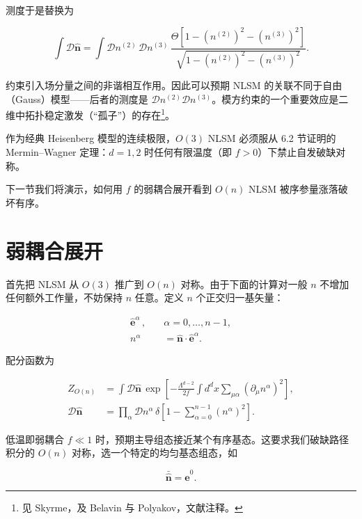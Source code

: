测度于是替换为

\begin{equation*}
\int \mathcal {D} \hat {\mathbf {n}} = \int \mathcal {D} n ^ {(2)} \, \mathcal {D} n ^ {(3)} \, \frac {\Theta \left[ 1 - ( n ^ {(2)} ) ^ {2} - ( n ^ {(3)} ) ^ {2} \right]}{\sqrt {1 - ( n ^ {(2)} ) ^ {2} - ( n ^ {(3)} ) ^ {2}}}.
\tag{13.11}
\end{equation*}

约束引入场分量之间的非谐相互作用。因此可以预期 NLSM 的关联不同于自由（Gauss）模型——后者的测度是 $\mathcal{D}n^{(2)}\mathcal{D}n^{(3)}$。模方约束的一个重要效应是二维中拓扑稳定激发（“孤子”）的存在\footnote{见 Skyrme，及 Belavin 与 Polyakov，文献注释。}。

作为经典 Heisenberg 模型的连续极限，$O(3)$ NLSM 必须服从 6.2 节证明的 Mermin--Wagner 定理：$d = 1, 2$ 时任何有限温度（即 $f > 0$）下禁止自发破缺对称。

下一节我们将演示，如何用 $f$ 的弱耦合展开看到 $O(n)$ NLSM 被序参量涨落破坏有序。

\section{弱耦合展开}

首先把 NLSM 从 $O(3)$ 推广到 $O(n)$ 对称。由于下面的计算对一般 $n$ 不增加任何额外工作量，不妨保持 $n$ 任意。定义 $n$ 个正交归一基矢量：

\begin{align*}
\hat {\mathbf {e}} ^ {\alpha} \, , \quad & \alpha = 0, \dots , n - 1 ,\\
n ^ {\alpha} & = \hat {\mathbf {n}} \cdot \hat {\mathbf {e}} ^ {\alpha} .
\tag{13.12}
\end{align*}

配分函数为

\begin{align*}
Z_{O(n)} & = \int \mathcal {D} \hat {\mathbf {n}} \, \exp \left[ - \frac {\Lambda^ {d - 2}}{2 f} \int d ^ {d} x \sum_ {\mu \alpha} \left( \partial_ {\mu} n ^ {\alpha} \right) ^ {2} \right] ,\\
\mathcal {D} \hat {\mathbf {n}} & = \prod_ {\alpha} \mathcal {D} n ^ {\alpha} \, \delta \left[ 1 - \sum_ {\alpha = 0} ^ {n - 1} \left( n ^ {\alpha} \right) ^ {2} \right] .
\tag{13.13}
\end{align*}

低温即弱耦合 $f \ll 1$ 时，预期主导组态接近某个有序基态。这要求我们破缺路径积分的 $O(n)$ 对称，选一个特定的均匀基态组态，如

\begin{equation*}
\bar {\hat {\mathbf {n}}} = \hat {\mathbf {e}} ^ {0}.
\tag{13.14}
\end{equation*}

